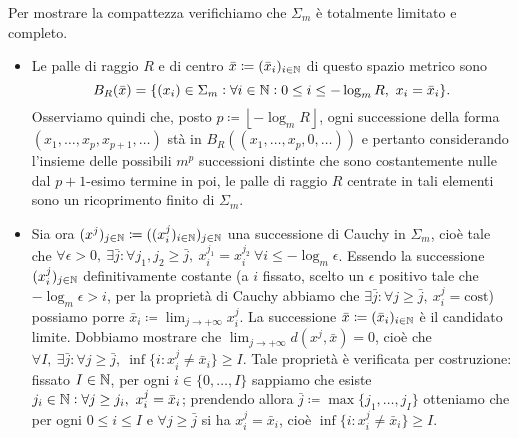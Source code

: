 \begin{example}
\begin{itemize}
        Per mostrare la compattezza verifichiamo che $ \Sigma_m $ è totalmente limitato e completo.
        \begin{itemize}
            \item Le palle di raggio $ R $ e di centro $ \bar{x} \coloneqq (\bar{x}_i)_{i \in \mathbb{N}} $ di questo spazio metrico sono 
            \[
            B_R(\bar{x}) = \{(x_i) \in \Sigma_m : \forall i \in \mathbb{N} : 0 \leq i \leq -\log_m{R}, \ x_i = \bar{x}_i\}.
            \] 
            Osserviamo quindi che, posto $ p \coloneqq \left \lfloor -\log_m{R} \right \rfloor $, ogni successione della forma \linebreak $ (x_1, \ldots, x_p, x_{p+1}, \ldots) $ stà in $ B_R{\left((x_1, \ldots, x_p, 0, \ldots)\right)} $ e pertanto considerando l'insieme delle possibili $ m^p $ successioni distinte che sono costantemente nulle dal $ p+1 $-esimo termine in poi, le palle di raggio $ R $ centrate in tali elementi sono un ricoprimento finito di $ \Sigma_m $. 
            \item Sia ora $ (x^j)_{j \in \mathbb{N}} \coloneqq ((x_i^j)_{i \in \mathbb{N}})_{j \in \mathbb{N}} $ una successione di Cauchy in $ \Sigma_m $, cioè tale che $ \forall \epsilon > 0, \ \exists \bar{j} : \forall j_1, j_2 \geq \bar{j}, \ x_i^{j_1} = x_i^{j_2} \ \forall i \leq -\log_m{\epsilon} $. Essendo la successione $ (x_i^j)_{j \in \mathbb{N}} $ definitivamente costante (a $ i $ fissato, scelto un $ \epsilon $ positivo tale che $ -\log_m{\epsilon} > i $, per la proprietà di Cauchy abbiamo che $ \exists \bar{j} : \forall j \geq \bar{j}, \ x_i^j = \text{cost} $) possiamo porre $ \bar{x}_i \coloneqq \lim_{j \to +\infty} x_i^j $. La successione $ \bar{x} \coloneqq (\bar{x}_i)_{i \in \mathbb{N}} $ è il candidato limite. Dobbiamo mostrare che $ \lim_{j \to +\infty} d(x^j, \bar{x}) = 0 $, cioè che $ \forall I, \ \exists \bar{j} : \forall j \geq \bar{j}, \ \inf{\{i : x_i^j \neq \bar{x}_i\}} \geq I $. Tale proprietà è verificata per costruzione: fissato $ I \in \mathbb{N} $, per ogni $ i \in \{0, \ldots, I\} $ sappiamo che esiste $ j_i \in \mathbb{N} : \forall j \geq j_i, \ x_i^j = \bar{x}_i $; prendendo allora $ \bar{j} \coloneqq \max \{j_1, \ldots, j_I\} $ otteniamo che per ogni $ 0 \leq i \leq I $ e $ \forall j \geq \bar{j} $ si ha $ x_i^j = \bar{x}_i $, cioè $ \inf{\{i : x_i^j \neq \bar{x}_i\}} \geq I $. 
        \end{itemize} 
	\end{itemize}
\end{example}

